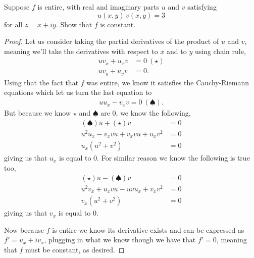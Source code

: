 \documentclass[11pt]{article}
\newenvironment{problem}[2][Problem\!]{\begin{trivlist}
\item[\hskip \labelsep {\bfseries #1}\hskip \labelsep {\bfseries #2}]}{\end{trivlist}}
\begin{document}
\begin{problem}{4.3}
Suppose $f$ is entire, with real and imaginary parts $u$ and $v$ satisfying
\[u(x, y)\, v(x, y) = 3\]
for all $z = x + i y$. Show that $f$ is constant.
\end{problem}
\begin{proof}
  Let us consider taking the partial derivatives of the product of $u$ and $v$, meaning we'll take the derivatives with respect to $x$ and to $y$ using chain rule,
  \begin{align*}
    uv_x + u_xv &= 0 \ ( \star)\\
    uv_y + u_yv &= 0.
  \end{align*}
  Using that the fact that $f$ was entire, we know it satisfies the Cauchy-Riemann equations which let us turn the last equation to 
  \begin{align*}
    uu_x -v_xv = 0 \ ( \spadesuit).
  \end{align*}
  But because we know $\star$ and $\spadesuit$ are 0, we know the following,
  \begin{align*}
    (\spadesuit) u + (\star) v &= 0 \\
    u^{2} u_x -v_xvu + v_xvu + u_xv^{2} &= 0 \\
    u_x(u^{2} + v^{2}) &= 0 
  \end{align*}
  giving us that $u_x$ is equal to 0.
  For similar reason we know the following is true too,
  \begin{align*}
    (\star)u  - (\spadesuit)v &= 0 \\
    u^{2}v_x  + u_xvu - uvu_x +v_xv^{2} &= 0\\
    v_x(u^{2} + v^{2}) &= 0
  \end{align*}
  giving us that $v_x$ is equal to 0.

  Now because $f $ is entire we know its derivative exists and can be expressed as $f' = u_x + iv_x$, plugging in what we know though we have that $f' = 0$, meaning that $f$ must be constant, as desired. 
\end{proof}

\newpage  %
\end{document}
